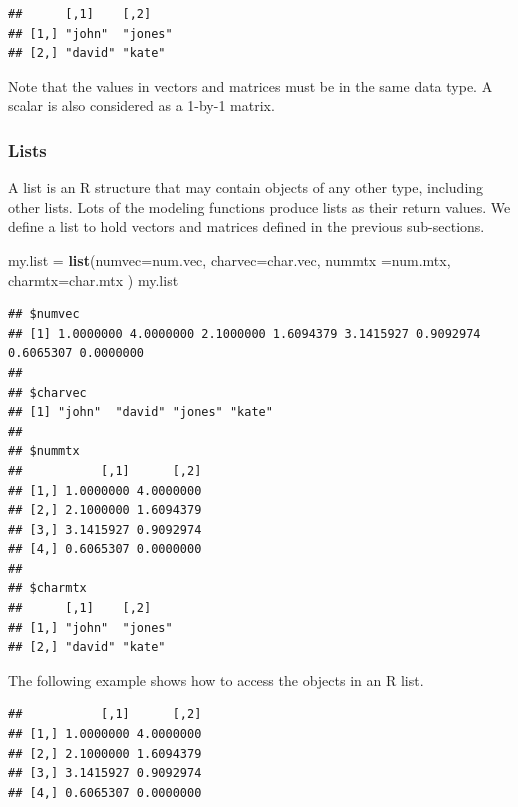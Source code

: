 \documentclass[
]{book}
\newenvironment{Shaded}{\begin{snugshade}}{\end{snugshade}}
\newcommand{\AttributeTok}[1]{\textcolor[rgb]{0.13,0.29,0.53}{#1}}
\newcommand{\FunctionTok}[1]{\textcolor[rgb]{0.13,0.29,0.53}{\textbf{#1}}}
\newcommand{\NormalTok}[1]{#1}
\newcommand{\OtherTok}[1]{\textcolor[rgb]{0.56,0.35,0.01}{#1}}
\newcommand{\SpecialCharTok}[1]{\textcolor[rgb]{0.81,0.36,0.00}{\textbf{#1}}}
\begin{document}
\begin{verbatim}
##      [,1]    [,2]   
## [1,] "john"  "jones"
## [2,] "david" "kate"
\end{verbatim}

Note that the values in vectors and matrices must be in the same data type. A scalar is also considered as a 1-by-1 matrix.

\hypertarget{lists}{%
\subsubsection{Lists}\label{lists}}

A list is an R structure that may contain objects of any other type, including other lists. Lots of the modeling functions produce lists as their return values. We define a list to hold vectors and matrices defined in the previous sub-sections.

\begin{Shaded}
\begin{Highlighting}[]
\NormalTok{my.list }\OtherTok{=} \FunctionTok{list}\NormalTok{(}\AttributeTok{numvec=}\NormalTok{num.vec, }\AttributeTok{charvec=}\NormalTok{char.vec, }\AttributeTok{nummtx =}\NormalTok{num.mtx, }\AttributeTok{charmtx=}\NormalTok{char.mtx )}
\NormalTok{my.list}
\end{Highlighting}
\end{Shaded}

\begin{verbatim}
## $numvec
## [1] 1.0000000 4.0000000 2.1000000 1.6094379 3.1415927 0.9092974 0.6065307 0.0000000
## 
## $charvec
## [1] "john"  "david" "jones" "kate" 
## 
## $nummtx
##           [,1]      [,2]
## [1,] 1.0000000 4.0000000
## [2,] 2.1000000 1.6094379
## [3,] 3.1415927 0.9092974
## [4,] 0.6065307 0.0000000
## 
## $charmtx
##      [,1]    [,2]   
## [1,] "john"  "jones"
## [2,] "david" "kate"
\end{verbatim}

The following example shows how to access the objects in an R list.

\begin{Shaded}
\end{Shaded}

\begin{verbatim}
##           [,1]      [,2]
## [1,] 1.0000000 4.0000000
## [2,] 2.1000000 1.6094379
## [3,] 3.1415927 0.9092974
## [4,] 0.6065307 0.0000000
\end{verbatim}
\end{document}
